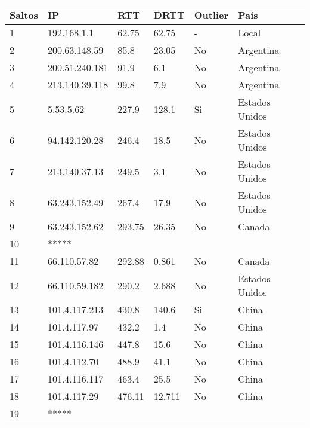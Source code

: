 \begin{center}
    \begin{tabular}{| l | l | l | l | l | l | }
    \hline
    Saltos & IP             & RTT    & DRTT   & Outlier & País           \\ \hline
    1      & 192.168.1.1    & 62.75  & 62.75  & -       & Local          \\ \hline
    2      & 200.63.148.59  & 85.8   & 23.05  & No      & Argentina      \\ \hline
    3      & 200.51.240.181 & 91.9   & 6.1    & No      & Argentina      \\ \hline
    4      & 213.140.39.118 & 99.8   & 7.9    & No      & Argentina      \\ \hline
    5      & 5.53.5.62      & 227.9  & 128.1  & Si      & Estados Unidos \\ \hline
    6      & 94.142.120.28  & 246.4  & 18.5   & No      & Estados Unidos \\ \hline
    7      & 213.140.37.13  & 249.5  & 3.1    & No      & Estados Unidos \\ \hline
    8      & 63.243.152.49  & 267.4  & 17.9   & No      & Estados Unidos \\ \hline
    9      & 63.243.152.62  & 293.75 & 26.35  & No      & Canada         \\ \hline
   10      & *****          &        &        &         &                \\ \hline
   11      & 66.110.57.82   & 292.88 & 0.861  & No      & Canada         \\ \hline
   12      & 66.110.59.182  & 290.2  & 2.688  & No      & Estados Unidos \\ \hline
   13      & 101.4.117.213  & 430.8  & 140.6  & Si      & China          \\ \hline
   14      & 101.4.117.97   & 432.2  & 1.4    & No      & China          \\ \hline
   15      & 101.4.116.146  & 447.8  & 15.6   & No      & China          \\ \hline
   16      & 101.4.112.70   & 488.9  & 41.1   & No      & China          \\ \hline
   17      & 101.4.116.117  & 463.4  & 25.5   & No      & China          \\ \hline
   18      & 101.4.117.29   & 476.11 & 12.711 & No      & China          \\ \hline
   19      & *****          &        &        &         &                \\ \hline

\end{tabular}
\end{center}
